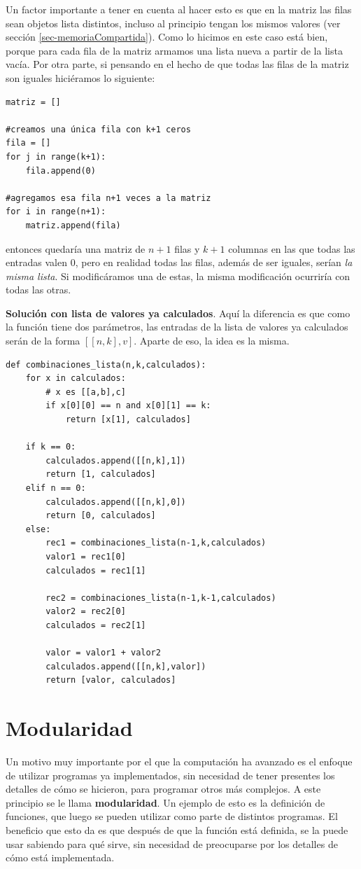 \documentclass[a4paper, 12pt]{report}
\theoremstyle{definition}
\begin{document}
Un factor importante a tener en cuenta al hacer esto es que en la matriz las filas sean objetos lista distintos, incluso al principio tengan los mismos valores (ver sección \ref{sec-memoriaCompartida}). Como lo hicimos en este caso está bien, porque para cada fila de la matriz armamos una lista nueva a partir de la lista vacía. Por otra parte, si pensando en el hecho de que todas las filas de la matriz son iguales hiciéramos lo siguiente:
\begin{verbatim}
matriz = []

#creamos una única fila con k+1 ceros
fila = []
for j in range(k+1):
    fila.append(0)
    
#agregamos esa fila n+1 veces a la matriz
for i in range(n+1):
    matriz.append(fila)
\end{verbatim}
entonces quedaría una matriz de $n+1$ filas y $k+1$ columnas en las que todas las entradas valen $0$, pero en realidad todas las filas, además de ser iguales, serían \emph{la misma lista}. Si modificáramos una de estas, la misma modificación ocurriría con todas las otras.

{\bf Solución con lista de valores ya calculados}. Aquí la diferencia es que como la función tiene dos parámetros, las entradas de la lista de valores ya calculados serán de la forma $[[n,k],v]$. Aparte de eso, la idea es la misma.
\begin{verbatim}
def combinaciones_lista(n,k,calculados):
    for x in calculados:
        # x es [[a,b],c]
        if x[0][0] == n and x[0][1] == k:
            return [x[1], calculados]
    
    if k == 0:
        calculados.append([[n,k],1])
        return [1, calculados]
    elif n == 0:
        calculados.append([[n,k],0])
        return [0, calculados]
    else:
        rec1 = combinaciones_lista(n-1,k,calculados)
        valor1 = rec1[0]
        calculados = rec1[1]
        
        rec2 = combinaciones_lista(n-1,k-1,calculados)
        valor2 = rec2[0]
        calculados = rec2[1]
        
        valor = valor1 + valor2
        calculados.append([[n,k],valor])
        return [valor, calculados]
\end{verbatim}


\chapter{Modularidad}

Un motivo muy importante por el que la computación ha avanzado es el enfoque de utilizar programas ya implementados, sin necesidad de tener presentes los detalles de cómo se hicieron, para programar otros más complejos. A este principio se le llama {\bf modularidad}. Un ejemplo de esto es la definición de funciones, que luego se pueden utilizar como parte de distintos programas. El beneficio que esto da es que después de que la función está definida, se la puede usar sabiendo para qué sirve, sin necesidad de preocuparse por los detalles de cómo está implementada.
\end{document}
